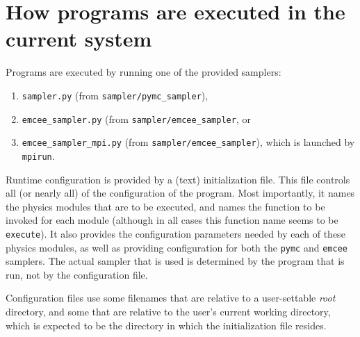 \documentclass[draftmode,draftwater]{memarticle}
\newcommand{\prog}[1]%
  {\texttt{#1}}
\begin{document}
\section{How programs are executed in the current system}

Programs are executed by running one of the provided samplers:
\begin{enumerate}
\item \prog{sampler.py} (from \prog{sampler/pymc\_sampler}),
\item \prog{emcee\_sampler.py} (from \prog{sampler/emcee\_sampler}, or
\item \prog{emcee\_sampler\_mpi.py} (from
  \prog{sampler/emcee\_sampler}), which is launched by \prog{mpirun}.
\end{enumerate}

Runtime configuration is provided by a (text) initialization file. This
file controls all (or nearly all) of the configuration of the program.
Most importantly, it names the physics modules that are to be executed,
and names the function to be invoked for each module (although in all
cases this function name seems to be \texttt{execute}). It also provides
the configuration parameters needed by each of these physics modules, as
well as providing configuration for both the \texttt{pymc} and
\texttt{emcee} samplers. The actual sampler that is used is determined
by the program that is run, not by the configuration file.

Configuration files use some filenames that are relative to a
user-settable \emph{root} directory, and some that are relative to the
user's current working directory, which is expected to be the directory
in which the initialization file resides.



\end{document}
